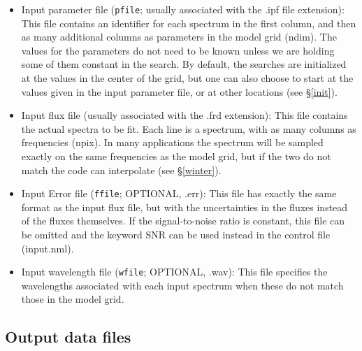 \documentclass[12pt]{article}
\begin{document}
\begin{itemize}

\item Input parameter file ({\tt pfile}; usually associated with the .ipf file extension): 
This file contains an identifier for each spectrum in the first column, and then as many 
additional columns as parameters in the model grid (ndim). The values for the parameters 
do not need to be known unless
we are holding some of them constant in the search. By default, the searches are
initialized at the values in the center of the grid, but one can also choose 
to start at the values given in the input parameter file, or at other locations 
(see \S \ref{init}).

\item Input flux file (usually associated with the .frd extension): This file 
contains the actual spectra to be fit. Each line is a spectrum, with as
many columns as frequencies (npix). In many applications the spectrum will 
be sampled exactly on the same frequencies as the model grid, but if the two
do not match the code can interpolate (see \S \ref{winter}).

\item Input Error file ({\tt ffile}; OPTIONAL, .err): This file has exactly the same format as the 
input flux file, but with the uncertainties in the fluxes instead of the fluxes themselves. 
If the signal-to-noise ratio is constant, this file can be omitted and the keyword SNR 
can be used instead in the control file (input.nml).

\item Input wavelength file ({\tt wfile}; OPTIONAL, .wav): This file specifies the wavelengths 
associated with each input spectrum when these do not match
those in the model grid.

\end{itemize}

\subsection{Output data files}
\label{output}
\end{document}
